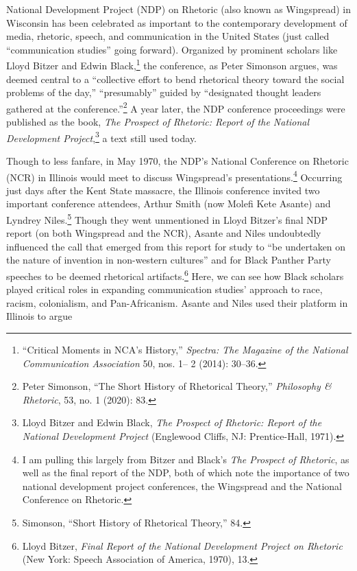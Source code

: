 \documentclass{tufte-handout}
\begin{document}
\begin{titlepage}
 National Development Project (NDP) on Rhetoric (also
known as Wingspread) in Wisconsin has been celebrated as important to
the contemporary development of media, rhetoric, speech, and
communication in the United States (just called ``communication
studies'' going forward). Organized by prominent scholars like Lloyd
Bitzer and Edwin Black,\footnote{``Critical Moments in NCA's History,'' \emph{Spectra: The Magazine of
  the National}
  \emph{Communication Association} 50, nos. 1-- 2 (2014): 30--36.
} the
conference, as Peter Simonson argues, was deemed central to a
``collective effort to bend rhetorical theory toward the social problems
of the day,'' ``presumably'' guided by ``designated thought leaders
gathered at the conference.''\footnote{Peter Simonson, ``The Short History of Rhetorical Theory,''
  \emph{Philosophy \& Rhetoric}, 53, no. 1 (2020): 83.
} A
year later, the NDP conference proceedings were published as the book,
\emph{The Prospect of Rhetoric: Report of the National Development
Project},\footnote{Lloyd Bitzer and Edwin Black, \emph{The Prospect of Rhetoric: Report
  of the National Development Project} (Englewood Cliffs, NJ:
  Prentice-Hall, 1971).
} a text still used today.

Though to less fanfare, in May 1970, the NDP's National Conference on
Rhetoric (NCR) in Illinois would meet to discuss Wingspread's
presentations.\footnote{I am pulling this largely from Bitzer and Black's \emph{The Prospect
  of Rhetoric}, as well as the final report of the NDP, both of which note the importance of two national development project conferences,
  the Wingspread and the National Conference on Rhetoric.
} Occurring just days
after the Kent State massacre, the Illinois conference invited two
important conference attendees, Arthur Smith (now Molefi Kete Asante)
and Lyndrey Niles.\footnote{Simonson, ``Short History of Rhetorical Theory,'' 84.
} Though they
went unmentioned in Lloyd Bitzer's final NDP report (on both Wingspread
and the NCR), Asante and Niles undoubtedly influenced the call that
emerged from this report for study to ``be undertaken on the nature of
invention in non-western cultures'' and for Black Panther Party speeches
to be deemed rhetorical artifacts.\footnote{Lloyd Bitzer, \emph{Final Report of the National Development Project
  on Rhetoric} (New York: Speech Association of America, 1970), 13.
}
Here, we can see how Black scholars played critical roles in expanding
communication studies' approach to race, racism, colonialism, and
Pan-Africanism. Asante and Niles used their platform in Illinois to
argue
\enlargethispage{2\baselineskip}

\vspace*{2em}



 \end{titlepage}
 
\end{document}
